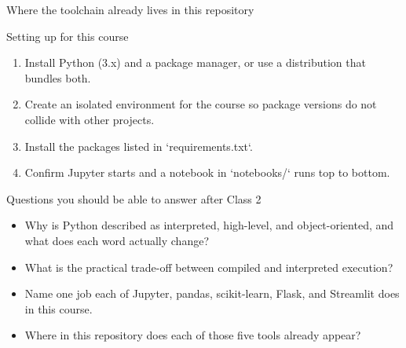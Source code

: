 \begin{frame}{Where the toolchain already lives in this repository}
\coursefooter
\end{frame}

\begin{frame}{Setting up for this course}
\begin{enumerate}
\item Install Python (3.x) and a package manager, or use a distribution that bundles both.
\item Create an isolated environment for the course so package versions do not collide with other projects.
\item Install the packages listed in `requirements.txt`.
\item Confirm Jupyter starts and a notebook in `notebooks/` runs top to bottom.
\end{enumerate}
\coursefooter
\end{frame}

\begin{frame}{Questions you should be able to answer after Class 2}
\begin{itemize}
\item Why is Python described as interpreted, high-level, and object-oriented, and what does each word actually change?
\item What is the practical trade-off between compiled and interpreted execution?
\item Name one job each of Jupyter, pandas, scikit-learn, Flask, and Streamlit does in this course.
\item Where in this repository does each of those five tools already appear?
\end{itemize}
\coursefooter
\end{frame}

